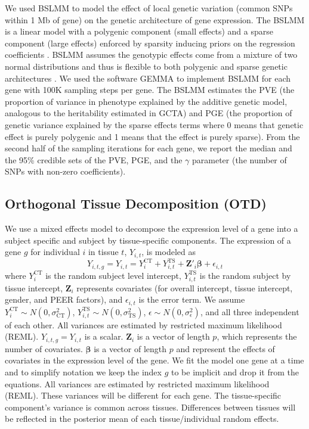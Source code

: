 \documentclass[10pt,letterpaper]{article}
\begin{document}
We used BSLMM \cite{Zhou_2013} to model the effect of local genetic variation
(common SNPs within 1 Mb of gene) on the genetic architecture of gene
expression. The BSLMM is a linear model with a polygenic component (small effects) and a sparse component (large effects)
enforced by sparsity inducing priors on the
regression coefficients \cite{Zhou_2013}. BSLMM assumes the genotypic effects come from a mixture of two normal distributions and thus is flexible to both polygenic and sparse genetic architectures \cite{Zhou_2013}. We used the software GEMMA \cite{Zhou_2012} to
implement BSLMM for each gene %
with 100K sampling steps per gene.
 The BSLMM estimates the PVE (the proportion of variance in
phenotype explained by the additive genetic model, analogous to the heritability estimated in GCTA) and PGE (the proportion of genetic variance explained by the sparse effects terms where 0 means that genetic effect is purely polygenic and 1 means that the effect is purely sparse). From the second half of the sampling iterations for each gene, we report the median and the 95\% credible sets of the
PVE, PGE, and the \textbar{}\(\gamma\)\textbar{} parameter (the number of SNPs with non-zero coefficients).

\subsection*{Orthogonal Tissue Decomposition (OTD)}\label{orthogonal-tissue-decomposition}

We use a mixed effects model to decompose the expression level of a gene into a subject specific and subject by tissue-specific components. The expression of a gene $g$ for individual $i$ in tissue $t$, $Y_{i,t}$, is modeled as
%
\[Y_{i,t,g} = Y_{i,t} =  Y_{i}^{\text{CT}}   + Y_{i,t}^{\text{TS}} + \mathbf{Z}'_i \boldsymbol{\beta} + \epsilon_{i,t}  \] 
%
where $Y_{i}^{\text{CT}}$ is the random subject level intercept,  $Y_{i,t}^{\text{TS}} $ is the random subject by tissue intercept, $\mathbf{Z}_i $ represents covariates (for overall intercept, tissue intercept, gender, and PEER factors), and $\epsilon_{i,t}$ is the error term. We assume $Y_{i}^{\text{CT}} \sim N(0,\sigma_{\text{CT}}^2)$, $Y_{i,t}^{\text{TS}} \sim N(0,\sigma_{\text{TS}}^2)$, $\epsilon \sim N(0,\sigma^2_{\epsilon})$, and all three independent of each other. All variances are estimated by restricted maximum likelihood (REML). $Y_{i,t,g}=Y_{i,t}$ is a scalar. $\mathbf{Z}_i$ is a vector of length $p$, which represents the number of covariates. $\boldsymbol{\beta}$ is a vector of length $p$ and represent the effects of covariates in the expression level of the gene. We fit the model one gene at a time and to simplify notation we keep the index $g$ to be implicit and drop it from the equations. All variances are estimated by restricted maximum likelihood (REML). These variances will be different for each gene. The tissue-specific component's variance is common across tissues. Differences between tissues will be reflected in the posterior mean of each tissue/individual random effects.
\end{document}
